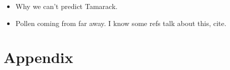 \documentclass[12pt]{article}
\begin{document}

\begin{itemize}
\item Why we can't predict Tamarack.
\item Pollen coming from far away. I know some refs talk about this, cite.
\end{itemize}




\appendix
\section{Appendix}
\label{append}


\newpage

\end{document}

